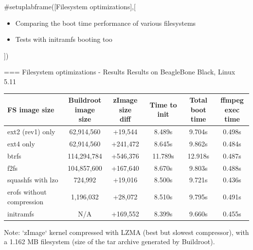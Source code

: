 #setuplabframe([Filesystem optimizations],[
\begin{itemize}
\item Comparing the boot time performance of various filesystems
\item Tests with initramfs booting too
\end{itemize}
])

=== Filesystem optimizations - Results Results on BeagleBone Black, Linux 5.11
\small
\begin{tabular}{| l || c | c | c | c | c |}
\hline FS image size & \makecell{Buildroot\\ image size} & \makecell{zImage size\\ diff} & Time to init & \makecell{Total\\ boot time} & \makecell{ffmpeg\\ exec time}\\
\hline ext2 (rev1) only & 62,914,560 & +19,544 & 8.489s & 9.704s & 0.498s \\
\hline ext4 only & 62,914,560 & +241,472 & 8.645s & 9.862s & 0.484s \\
\hline btrfs & 114,294,784 & +546,376 & 11.789s & 12.918s & 0.487s \\
\hline f2fs & 104,857,600 & +167,640 & 8.670s & 9.803s & 0.488s \\
\hline squashfs with lzo & 724,992 & +19,016 & 8.500s & 9.721s & 0.436s \\
\hline erofs without compression & 1,196,032 & +28,072 & 8.510s & 9.795s & 0.491s \\
\hline initramfs & N/A & +169,552 & 8.399s & 9.660s & 0.455s \\
\hline
\end{tabular}
\vfill Note: `zImage` kernel compressed with LZMA (best but slowest compressor), with a 1.162 MB filesystem (size of the tar archive generated by Buildroot).


